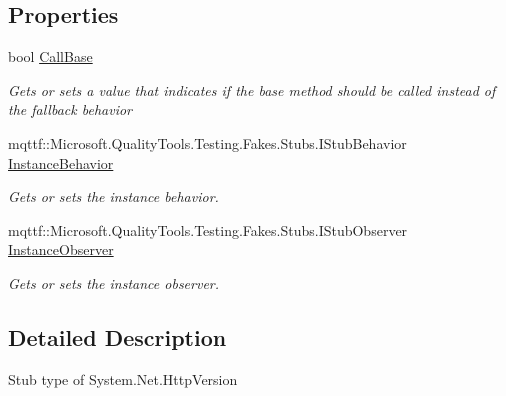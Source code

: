 \subsection*{Properties}
\begin{DoxyCompactItemize}
\item 
bool \hyperlink{class_system_1_1_net_1_1_fakes_1_1_stub_http_version_a8b4fc26f8917a7f8e2ff5b3bf73d4736}{Call\-Base}
\begin{DoxyCompactList}\small\item\em Gets or sets a value that indicates if the base method should be called instead of the fallback behavior\end{DoxyCompactList}\item 
mqttf\-::\-Microsoft.\-Quality\-Tools.\-Testing.\-Fakes.\-Stubs.\-I\-Stub\-Behavior \hyperlink{class_system_1_1_net_1_1_fakes_1_1_stub_http_version_ae458623cbacd48bdeac27b513ebfb837}{Instance\-Behavior}
\begin{DoxyCompactList}\small\item\em Gets or sets the instance behavior.\end{DoxyCompactList}\item 
mqttf\-::\-Microsoft.\-Quality\-Tools.\-Testing.\-Fakes.\-Stubs.\-I\-Stub\-Observer \hyperlink{class_system_1_1_net_1_1_fakes_1_1_stub_http_version_a5616af2bd40ac609e6adf3a70525bf29}{Instance\-Observer}
\begin{DoxyCompactList}\small\item\em Gets or sets the instance observer.\end{DoxyCompactList}\end{DoxyCompactItemize}


\subsection{Detailed Description}
Stub type of System.\-Net.\-Http\-Version



